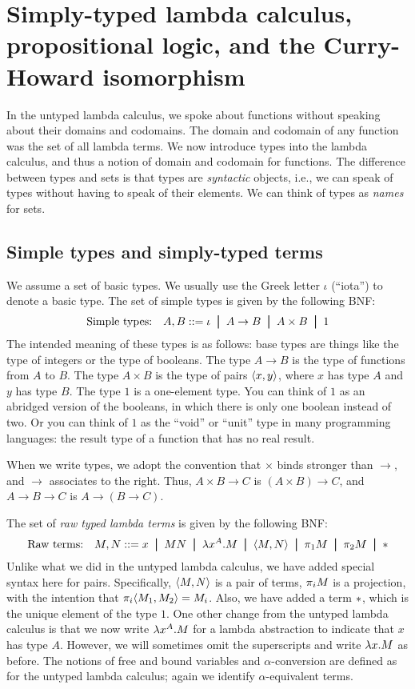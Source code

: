 \documentclass{article}
\begin{document}
\section{Simply-typed lambda calculus, propositional logic, and the Curry-Howard isomorphism}\label{sec-simply-typed-lc}

In the untyped lambda calculus, we spoke about functions without
speaking about their domains and codomains. The domain and codomain of
any function was the set of all lambda terms. We now introduce types
into the lambda calculus, and thus a notion of domain and codomain for
functions. The difference between types and sets is that types are
{\em syntactic} objects, i.e., we can speak of types without having to
speak of their elements. We can think of types as {\em names} for
sets.

\subsection{Simple types and simply-typed terms}

We assume a set of basic types. We usually use the Greek letter
$\iota$ (``iota'') to denote a basic type. The set of simple types is
given by the following BNF:
\[ \mbox{Simple types:}\ssep A,B \bnf \iota \bor A\to B\bor A\times
B\bor 1
\]
The intended meaning of these types is as follows: base types are
things like the type of integers or the type of booleans. The type $A\to
B$ is the type of functions from $A$ to $B$. The type $A\times B$ is
the type of pairs $\langle x,y\rangle$, where $x$ has type $A$ and $y$ has
type $B$. The type $1$ is a one-element type. You can think of $1$ as
an abridged version of the booleans, in which there is only one
boolean instead of two. Or you can think of $1$ as the ``void'' or
``unit'' type in many programming languages: the result type of a
function that has no real result.

When we write types, we adopt the convention that $\times$ binds
stronger than $\to$, and $\to$ associates to the right. Thus, $A\times
B\to C$ is $(A\times B)\to C$, and $A\to B\to C$ is $A\to (B\to C)$.

The set of {\em raw typed lambda terms} is given by the following BNF:
\[ \mbox{Raw terms:}\ssep M,N \bnf x \bor MN \bor \lamabs{x}{A}.M
\bor \pair{M,N} \bor \proj1 M \bor \proj2 M \bor \unit \] Unlike what
we did in the untyped lambda calculus, we have added special syntax
here for pairs. Specifically, $\langle M,N\rangle$ is a pair of terms,
$\pi_{i} M$ is a projection, with the intention that
$\pi_{i}\langle M_1,M_2\rangle=M_i$. Also, we have added a term ${*}$,
which is the unique element of the type $1$. One other change from the
untyped lambda calculus is that we now write $\lambda x^{A}.M$ for a
lambda abstraction to indicate that $x$ has type $A$. However, we will
sometimes omit the superscripts and write $\lambda x.M$ as before. The
notions of free and bound variables and $\alpha$-conversion are
defined as for the untyped lambda calculus; again we identify
$\alpha$-equivalent terms.
\end{document}
